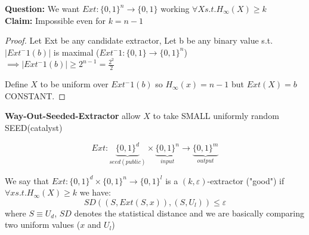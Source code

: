 \textbf{Question: }We want $Ext:\{0,1\}^n \to \{0,1\}$ working $\forall X s.t. H_{\infty}(X)\geq k$\\
\textbf{Claim: } Impossible even for $k=n-1$
\begin{proof}
    Let Ext be any candidate extractor, Let b be any binary value s.t. $|Ext^-1(b)|$ is maximal ($Ext^-1: \{0,1\} \to \{0,1\}^n$)\\
    $\implies |Ext^-1(b)|\geq 2^{n-1}=\frac{2^2}{2}$

    \begin{figure}[ht]
        \centering
    \end{figure}

    Define $X$ to be uniform over $Ext^-1(b)$ so $H_{\infty}(x)=n-1$ but $Ext(X)=b$ CONSTANT.
\end{proof}

\begin{theorem}
    \textbf{Way-Out-Seeded-Extractor} allow $X$ to take SMALL uniformly random SEED(catalyst)

    $$Ext: \underbrace{\{0,1\}^d}_{seed(public)}\times \underbrace{\{0,1\}^n}_{input} \to \underbrace{\{0,1\}^m}_{output}$$
\end{theorem}
\begin{definition}
    We say that $Ext:\{0,1\}^d \times \{0,1\}^n \to \{0,1\}^l$ is a $(k,\varepsilon)$-extractor ("good") if $\forall x s.t. H_{\infty}(X)\geq k$ we have:
    $$SD((S,Ext(S,x)),(S,U_l))\leq \varepsilon$$ 
    where $S\equiv U_d$, $SD$ denotes the statistical distance and we are basically comparing two uniform values ($x$ and $U_l$) 
\end{definition}

